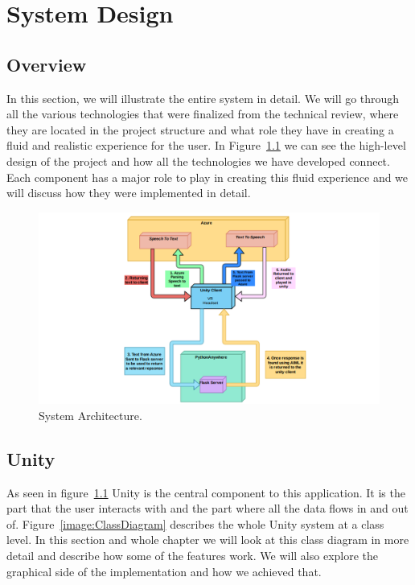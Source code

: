 \chapter{System Design}

\section{Overview}
In this section, we will illustrate the entire system in detail. We will go through all the various technologies that were finalized from the technical review, where they are located in the project structure and what role they have in creating a fluid and realistic experience for the user. In Figure~\ref{image:SystemArch} we can see the high-level design of the project and how all the technologies we have developed connect. Each component has a major role to play in creating this fluid experience and we will discuss how they were implemented in detail.

\begin{figure}[h!]
	\caption{System Architecture.}
	\label{image:SystemArch}
	\centering
	\includegraphics[width=1\textwidth]{Images/uml2.png}
\end{figure}

\section{Unity}
As seen in figure~\ref{image:SystemArch} Unity is the central component to this application. It is the part that the user interacts with and the part where all the data flows in and out of. Figure~\ref{image:ClassDiagram} describes the whole Unity system at a class level. In this section and whole chapter we will look at this class diagram in more detail and describe how some of the features work. We will also explore the graphical side of the implementation and how we achieved that.

